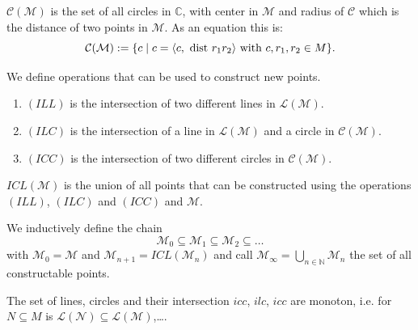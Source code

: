 \begin{definition}
    \label{def:set_of_circles}
    \leanok
    $\mathcal{C(M)}$ is the set of all circles in $\mathbb{C}$, with center in $\mathcal{M}$ and radius of $\mathcal{C}$ which is the distance of two points in $\mathcal{M}$. As an equation this is:
    $$\mathcal{C(M)}:=\{c\mid c = \langle c, \text{ dist } r_1 r_2 \rangle \text{ with } c,r_1,r_2\in M\}.$$
\end{definition}

\begin{definition}
    \label{def:rules_to_constructed_a_point}
    \leanok
    We define operations that can be used to construct new points.
    \begin{enumerate}
        \item $(ILL)$ is the intersection of two different lines in $\mathcal{L(M)}$.
        \item $(ILC)$ is the intersection of a line in $\mathcal{L(M)}$ and a circle in $\mathcal{C(M)}$.
        \item $(ICC)$ is the intersection of two different circles in $\mathcal{C(M)}$.
    \end{enumerate}
    $ICL(\mathcal{M})$ is the union of all points that can be constructed using the operations $(ILL)$, $(ILC)$ and $(ICC)$ and $\mathcal{M}$.
\end{definition}

\begin{definition}
    \label{def:set_of_constructable_points}
    \leanok
    We inductively define the chain
    \begin{equation*}
        \mathcal{M}_0 \subseteq \mathcal{M}_1 \subseteq \mathcal{M}_2 \subseteq \dots
    \end{equation*}
    with $\mathcal{M}_0 = \mathcal{M}$ and $\mathcal{M}_{n+1} = ICL(\mathcal{M}_n)$\newline
    and call $\mathcal{M}_{\infty} = \bigcup_{n \in \mathbb{N}} \mathcal{M}_n$ the set of all constructable points.
\end{definition}

\begin{remark}
    The set of lines, circles and their intersection $icc$, $ilc$, $icc$ are monoton, i.e. for $N\subseteq M$ is $\mathcal{L(N)}
    \subseteq\mathcal{L(M)}$,\dots .
\end{remark}

